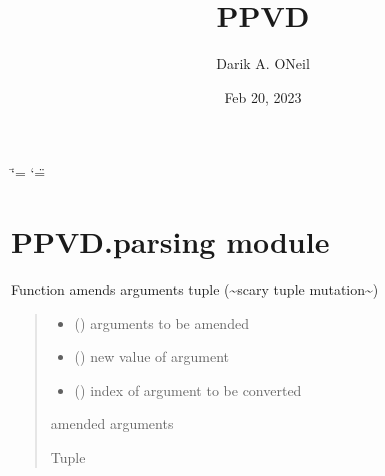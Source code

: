 \documentclass[letterpaper,10pt,english]{sphinxmanual}
\title{PPVD}
\date{Feb 20, 2023}
\author{Darik A.\@{} O\textquotesingle{}Neil}
\begin{document}
\ifdefined\shorthandoff
  \ifnum\catcode`\=\string=\active\shorthandoff{=}\fi
  \ifnum\catcode`\"=\active{}\fi
\fi

\pagestyle{empty}
\sphinxmaketitle
\pagestyle{plain}
\sphinxtableofcontents
\pagestyle{normal}
\label{\detokenize{index::doc}}


\sphinxstepscope


\chapter{PPVD.parsing module}
\label{\detokenize{PPVD.parsing:module-PPVD.parsing}}\label{\detokenize{PPVD.parsing:ppvd-parsing-module}}\label{\detokenize{PPVD.parsing::doc}}

\begin{fulllineitems}
\label{\detokenize{PPVD.parsing:PPVD.parsing.amend_args}}
\pysigstartsignatures
{}
\pysigstopsignatures
\sphinxAtStartPar
Function amends arguments tuple (\textasciitilde{}scary tuple mutation\textasciitilde{})
\begin{quote}\begin{description}
\begin{itemize}
\item {} 
\sphinxAtStartPar
{} () \textendash{} arguments to be amended

\item {} 
\sphinxAtStartPar
{} () \textendash{} new value of argument

\item {} 
\sphinxAtStartPar
{} () \textendash{} index of argument to be converted

\end{itemize}

\sphinxAtStartPar
amended arguments

\sphinxAtStartPar
Tuple

\end{description}\end{quote}

\end{fulllineitems}
\end{document}
